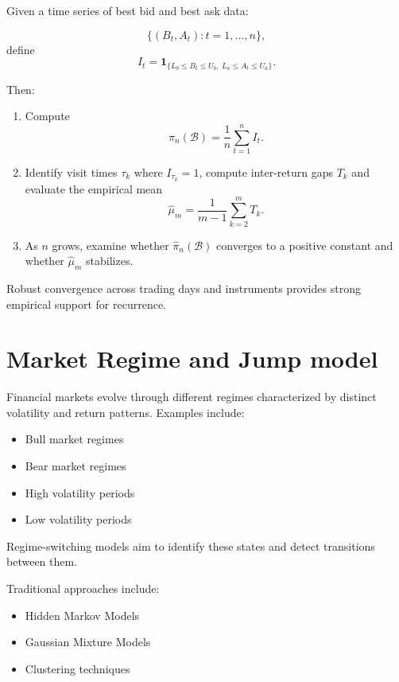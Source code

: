\documentclass[11pt]{article}
\begin{document}
Given a time series of best bid and best ask data:

\[
\{(B_t, A_t) : t = 1, \dots, n\},
\]
define
\[
I_t = \mathbf{1}_{\{ L_b \le B_t \le U_b,\ L_a \le A_t \le U_a \}}.
\]

Then:

\begin{enumerate}
    \item Compute
    \[
    \widehat{\pi}_n(\mathcal{B}) = \frac{1}{n}\sum_{t=1}^{n} I_t.
    \]

    \item Identify visit times $\tau_k$ where $I_{\tau_k} = 1$, compute inter-return gaps $T_k$ and evaluate the empirical mean
    \[
    \widehat{\mu}_m = \frac{1}{m-1}\sum_{k=2}^{m} T_k.
    \]

    \item As $n$ grows, examine whether $\widehat{\pi}_n(\mathcal{B})$ converges to a positive constant and whether $\widehat{\mu}_m$ stabilizes.
\end{enumerate}

Robust convergence across trading days and instruments provides strong empirical support for recurrence.

\section{Market Regime and Jump model}

Financial markets evolve through different regimes characterized by
distinct volatility and return patterns. Examples include:

\begin{itemize}
\item Bull market regimes
\item Bear market regimes
\item High volatility periods
\item Low volatility periods
\end{itemize}

Regime-switching models aim to identify these states and detect
transitions between them.

Traditional approaches include:

\begin{itemize}
\item Hidden Markov Models
\item Gaussian Mixture Models
\item Clustering techniques
\end{itemize}
\end{document}
